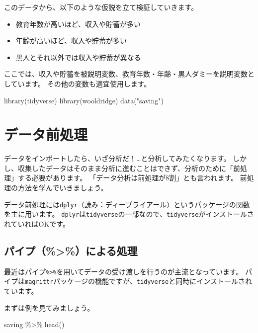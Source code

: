 \documentclass[
]{book}
\newenvironment{Shaded}{\begin{snugshade}}{\end{snugshade}}
\newcommand{\FunctionTok}[1]{\textcolor[rgb]{0.00,0.00,0.00}{#1}}
\newcommand{\NormalTok}[1]{#1}
\newcommand{\SpecialCharTok}[1]{\textcolor[rgb]{0.00,0.00,0.00}{#1}}
\newcommand{\StringTok}[1]{\textcolor[rgb]{0.31,0.60,0.02}{#1}}
\providecommand{\tightlist}{%
  \setlength{\itemsep}{0pt}\setlength{\parskip}{0pt}}
\begin{document}
このデータから、以下のような仮説を立て検証していきます。

\begin{itemize}
\tightlist
\item
  教育年数が高いほど、収入や貯蓄が多い
\item
  年齢が高いほど、収入や貯蓄が多い
\item
  黒人とそれ以外では収入や貯蓄が異なる
\end{itemize}

ここでは、収入や貯蓄を被説明変数、教育年数・年齢・黒人ダミーを説明変数としています。
その他の変数も適宜使用します。

\begin{Shaded}
\begin{Highlighting}[]
\FunctionTok{library}\NormalTok{(tidyverse)}
\FunctionTok{library}\NormalTok{(wooldridge)}
\FunctionTok{data}\NormalTok{(}\StringTok{"saving"}\NormalTok{)}
\end{Highlighting}
\end{Shaded}

\hypertarget{DataHandling}{%
\chapter{データ前処理}\label{DataHandling}}

データをインポートしたら、いざ分析だ！\ldots と分析してみたくなります。
しかし、収集したデータはそのまま分析に進むことはできず、分析のために「前処理」する必要があります。
「データ分析は前処理が8割」とも言われます。
前処理の方法を学んでいきましょう。

データ前処理には\texttt{dplyr}（読み：ディープライアール）というパッケージの関数を主に用います。
\texttt{dplyr}は\texttt{tidyverse}の一部なので、\texttt{tidyverse}がインストールされていればOKです。

\hypertarget{ux30d1ux30a4ux30d7ux306bux3088ux308bux51e6ux7406}{%
\section{パイプ（\%\textgreater\%）による処理}\label{ux30d1ux30a4ux30d7ux306bux3088ux308bux51e6ux7406}}

最近はパイプ\texttt{\%\textgreater{}\%}を用いてデータの受け渡しを行うのが主流となっています。
パイプは\texttt{magrittr}パッケージの機能ですが、\texttt{tidyverse}と同時にインストールされています。

まずは例を見てみましょう。

\begin{Shaded}
\begin{Highlighting}[]
\NormalTok{saving }\SpecialCharTok{\%\textgreater{}\%} \FunctionTok{head}\NormalTok{()}
\end{Highlighting}
\end{Shaded}
\end{document}
